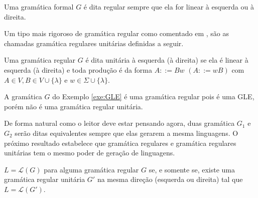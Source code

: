 \begin{definicao}
	Uma gramática formal $G$ é dita regular sempre que ela for linear à esquerda ou à direita.
\end{definicao}

Um tipo mais rigoroso de gramática regular como comentado em \cite{benjaLivro2010, linz2006},  são as chamadas gramática regulares unitárias definidas a seguir.

\begin{definicao}
	Uma gramática regular $G$ é dita unitária à esquerda (à direita) se ela é linear à esquerda (à direita) e toda produção é da forma $A ::= Bw$ $(A ::= wB)$ com $A \in V, B \in V \cup \{\lambda\}$ e $w \in \Sigma \cup \{\lambda\}$.
\end{definicao}

\begin{exemplo}
	A gramática $G$ do Exemplo \ref{exe:GLE} é uma gramática regular pois é uma GLE, porém não é uma gramática regular unitária.
\end{exemplo}

De forma natural como o leitor deve estar pensando agora,  duas gramática $G_1$ e $G_2$ serão ditas equivalentes sempre que elas gerarem a mesma linguagens. O próximo resultado estabelece que gramática regulares e gramática regulares unitárias tem o mesmo poder de geração de linguagens.

\begin{teorema}\label{teo:SimplificacaoRegular}
	$L = \mathcal{L}(G)$ para alguma gramática regular $G$ se, e somente se, existe uma gramática regular unitária $G'$ na mesma direção (esquerda ou direita) tal que $L = \mathcal{L}(G')$.
\end{teorema}

